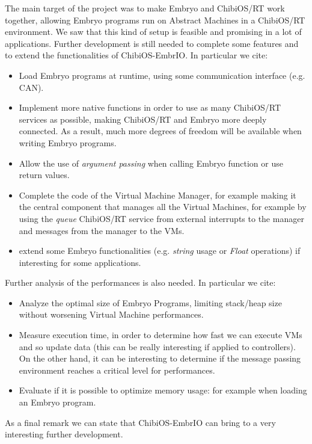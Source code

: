 \documentclass[a4paper,10pt]{article}
\begin{document}
\begin{multicols}{2}
The main target of the project was to make Embryo and ChibiOS/RT work together, allowing Embryo programs run on Abstract Machines in a ChibiOS/RT environment. We saw that this kind of setup is feasible and promising in a lot of applications.\newline
Further development is still needed to complete some features and to extend the functionalities of ChibiOS-EmbrIO. In particular we cite:

\begin{itemize}
\item Load Embryo programs at runtime, using some communication interface (e.g. CAN).
\item Implement more native functions in order to use as many ChibiOS/RT services as possible, making ChibiOS/RT and Embryo more deeply connected. As a result, much more degrees of freedom will be available when writing Embryo programs.
\item Allow the use of \textit{argument passing} when calling Embryo function or use return values.
\item Complete the code of the Virtual Machine Manager, for example making it the central component that manages all the Virtual Machines, for example by using the \textit{queue} ChibiOS/RT service from external interrupts to the manager and messages from the manager to the VMs.
\item extend some Embryo functionalities (e.g. \textit{string} usage or \textit{Float} operations) if interesting for some applications.
\end{itemize}

Further analysis of the performances is also needed. In particular we cite:

\begin{itemize}
\item Analyze the optimal size of Embryo Programs, limiting stack/heap size without worsening Virtual Machine performances.
\item Measure execution time, in order to determine how fast we can execute VMs and so update data (this can be really interesting if applied to controllers). On the other hand, it can be interesting to determine if the message passing environment reaches a critical level for performances.
\item Evaluate if it is possible to optimize memory usage: for example when loading an Embryo program.
\end{itemize}

As a final remark we can state that ChibiOS-EmbrIO can bring to a very interesting further development.


\end{multicols}
\end{document}
